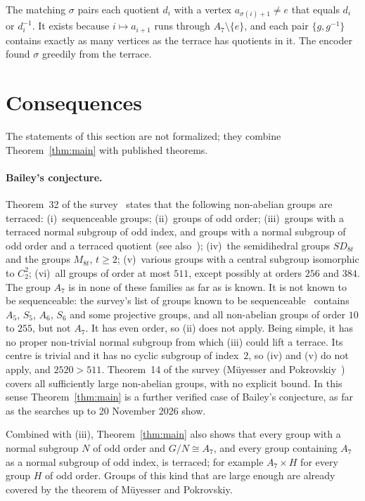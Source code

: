 \documentclass[11pt]{article}
\theoremstyle{definition}
\theoremstyle{remark}
\newcommand{\Alt}{A_7}
\begin{document}
\noindent The matching $\sigma$ pairs each quotient $d_i$ with a vertex
$a_{\sigma(i)+1}\ne e$ that equals $d_i$ or $d_i^{-1}$. It exists because
$i\mapsto a_{i+1}$ runs through $\Alt\setminus\{e\}$, and each pair
$\{g,g^{-1}\}$ contains exactly as many vertices as the terrace has quotients
in it. The encoder found $\sigma$ greedily from the terrace.

\section{Consequences}\label{sec:context}

The statements of this section are not formalized; they combine
Theorem~\ref{thm:main} with published theorems.

\paragraph{Bailey's conjecture.}
Theorem~32 of the survey~\cite{survey} states that the following non-abelian
groups are terraced: (i)~sequenceable groups; (ii)~groups of odd order;
(iii)~groups with a terraced normal subgroup of odd index, and groups with a
normal subgroup of odd order and a terraced quotient (see
also~\cite[Theorem~2.4]{ollis16}); (iv)~the semidihedral groups $SD_{8t}$
and the groups $M_{8t}$, $t\ge2$; (v)~various groups with a central subgroup
isomorphic to $C_2^2$; (vi)~all groups of order at most $511$, except possibly
at orders $256$ and $384$. The group $\Alt$ is in none of these families as
far as is known. It is not known to be sequenceable: the survey's list of
groups known to be sequenceable~\cite[Section~2.6]{survey} contains $A_5$,
$S_5$, $A_6$, $S_6$ and some projective groups, and all non-abelian groups of order $10$ to $255$, but not $\Alt$. It has even order, so (ii) does not
apply. Being simple, it has
no proper non-trivial normal subgroup from which (iii) could lift a terrace.
Its centre is trivial and it has no cyclic subgroup of index~$2$, so (iv) and
(v) do not apply, and $2520>511$. Theorem~14 of the survey (Müyesser and
Pokrovskiy~\cite[Theorem~6.12]{mp}) covers all sufficiently large non-abelian
groups, with no explicit bound. In this sense Theorem~\ref{thm:main} is a
further verified case of Bailey's conjecture, as far as the searches up to
20 November 2026 show.

Combined with (iii), Theorem~\ref{thm:main} also shows that every group with
a normal subgroup $N$ of odd order and $G/N\cong\Alt$, and every group
containing $\Alt$ as a normal subgroup of odd index, is terraced; for
example $\Alt\times H$ for every group $H$ of odd order. Groups of this kind
that are large enough are already covered by the theorem of Müyesser and
Pokrovskiy.
\end{document}
